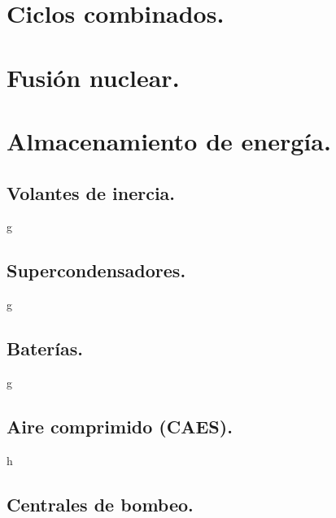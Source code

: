 \section{Ciclos combinados.}

\section{Fusión nuclear.}

\section{Almacenamiento de energía.}

\subsection{Volantes de inercia.}
g
\subsection{Supercondensadores.}
g
\subsection{Baterías.}
g
\subsection{Aire comprimido (CAES).}
h
\subsection{Centrales de bombeo.}